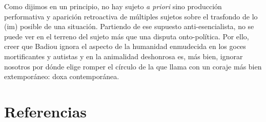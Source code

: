 Como dijimos en un principio, no hay sujeto \emph{a priori} sino producción performativa y aparición retroactiva de múltiples sujetos sobre el trasfondo de lo (im) posible de una situación. Partiendo de ese supuesto anti-esencialista, no se puede ver en el terreno del sujeto más que una disputa onto-política. Por ello, creer que Badiou ignora el aspecto de la humanidad enmudecida en los goces mortificantes y autistas y en la animalidad deshonrosa es, más bien, ignorar nosotros por dónde elige romper el círculo de la que llama con un coraje más bien extemporáneo: doxa contemporánea.


\section*{Referencias}
\printbibliography[heading=none]   %


\ifPDF
{}
\fi
